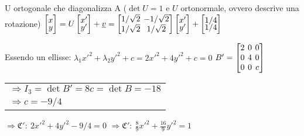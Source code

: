 U ortogonale che diagonalizza A ($\det U = 1$ e $U$ ortonormale, ovvero descrive una rotazione)
$
\begin{bmatrix}
	x \\[-0.3em]
	y \\
\end{bmatrix}
= U
\begin{bmatrix}
	x' \\[-0.3em]
	y' \\
\end{bmatrix}
+ \vec{v}=
\left[
	\arraycolsep=2.0pt\def\arraystretch{1.0}
	\begin{array}{@{}cc@{}}
		1/\sqrt{2} & -1/\sqrt{2} \\
		1/\sqrt{2} & 1/\sqrt{2}
	\end{array}
\right]
\begin{bmatrix}
	x' \\[-0.3em]
	y' \\
\end{bmatrix}
+
\begin{bmatrix}
	1/4 \\[-0.3em]
	1/4 \\
\end{bmatrix}
$

Essendo un ellisse: $\lambda_1x'^2 + \lambda_2y'^2 + c = 2x'^2 + 4y'^2 + c = 0$
$
B' = \left[
	\arraycolsep=2.0pt\def\arraystretch{1.0}
	\begin{array}{@{}ccc@{}}
		2 & 0 & 0 \\
		0 & 4 & 0 \\
		0 & 0 & c \\
	\end{array}
\right]
$
\begin{tabular}{l}
	$\Rightarrow I_3 = \det B' = 8c = \det B = -18$ \\
	$\Rightarrow c = -9/4$
\end{tabular}
$\Rightarrow \mathfrak{C'}:\ 2x'^2 + 4y'^2 -9/4 = 0$
$\Rightarrow \mathfrak{C'}:\ \frac{8}{9}x'^2 + \frac{16}{9}y'^2 = 1$
